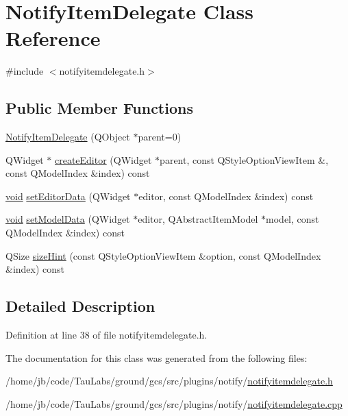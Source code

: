 \hypertarget{class_notify_item_delegate}{\section{\-Notify\-Item\-Delegate \-Class \-Reference}
\label{class_notify_item_delegate}
}


{\ttfamily \#include $<$notifyitemdelegate.\-h$>$}

\subsection*{\-Public \-Member \-Functions}
\begin{DoxyCompactItemize}
\item 
\hyperlink{group___notify_plugin_ga356769d008d39fd8dfdf8377c20ea450}{\-Notify\-Item\-Delegate} (\-Q\-Object $\ast$parent=0)
\item 
\-Q\-Widget $\ast$ \hyperlink{group___notify_plugin_ga5b91b80661023d558e683e9b0fadca50}{create\-Editor} (\-Q\-Widget $\ast$parent, const \-Q\-Style\-Option\-View\-Item \&, const \-Q\-Model\-Index \&index) const 
\item 
\hyperlink{group___u_a_v_objects_plugin_ga444cf2ff3f0ecbe028adce838d373f5c}{void} \hyperlink{group___notify_plugin_ga75249b15c513ab2ea9691a7e2307ef19}{set\-Editor\-Data} (\-Q\-Widget $\ast$editor, const \-Q\-Model\-Index \&index) const 
\item 
\hyperlink{group___u_a_v_objects_plugin_ga444cf2ff3f0ecbe028adce838d373f5c}{void} \hyperlink{group___notify_plugin_gacd6ffc2f5989d0a64c398e6604d72e8e}{set\-Model\-Data} (\-Q\-Widget $\ast$editor, \-Q\-Abstract\-Item\-Model $\ast$model, const \-Q\-Model\-Index \&index) const 
\item 
\-Q\-Size \hyperlink{group___notify_plugin_ga5529e9472e4132a0066755c88969323b}{size\-Hint} (const \-Q\-Style\-Option\-View\-Item \&option, const \-Q\-Model\-Index \&index) const 
\end{DoxyCompactItemize}


\subsection{\-Detailed \-Description}


\-Definition at line 38 of file notifyitemdelegate.\-h.



\-The documentation for this class was generated from the following files\-:\begin{DoxyCompactItemize}
\item 
/home/jb/code/\-Tau\-Labs/ground/gcs/src/plugins/notify/\hyperlink{notifyitemdelegate_8h}{notifyitemdelegate.\-h}\item 
/home/jb/code/\-Tau\-Labs/ground/gcs/src/plugins/notify/\hyperlink{notifyitemdelegate_8cpp}{notifyitemdelegate.\-cpp}\end{DoxyCompactItemize}

